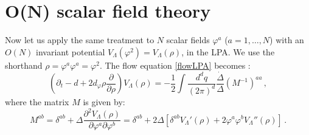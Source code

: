 \documentclass[11pt,a4paper]{article}
\numberwithin{figure}{section}
\numberwithin{equation}{section}
\begin{document}
\section{O(N) scalar field theory}
\label{sec:on}

Now let us apply the same treatment to $N$ scalar fields $\varphi^a$ ($a = 1,\ldots,N$) with an $O(N)$ invariant potential $V_\Lambda(\varphi^2) = V_\Lambda(\rho)$, in the LPA. We use the shorthand $\rho = \varphi^a \varphi^a = \varphi^2$.  The flow equation \eqref{flowLPA} becomes \cite{Morris:1997xj,DAttanasio:1997he}:
\begin{equation} \label{flowN3}
    \left( \partial_t - d + 2 d_\varphi \rho \frac{\partial}{\partial \rho} \right) V_\Lambda(\rho) = - \frac{1}{2} \int \frac{d^d q}{(2\pi)^d} \frac{\dot{\Delta}}{\Delta}  \left( M^{-1} \right)^{aa} \,, 
\end{equation}
where the matrix $M$ is given by:
\begin{equation} \label{M2}
    M^{ab} = \delta^{ab}+\Delta \frac{\partial^2 V_\Lambda(\rho)}{\partial \varphi^a \partial \varphi^b} = \delta^{ab} + 2 \Delta \left[ \delta^{ab} V_\Lambda'(\rho) + 2 \varphi^a \varphi^b V_\Lambda''(\rho) \right] \,.
\end{equation}
\end{document}
